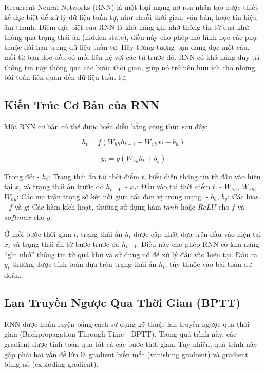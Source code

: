 Recurrent Neural Networks (RNN) là một loại mạng nơ-ron nhân tạo được thiết kế đặc biệt để xử lý dữ liệu tuần tự, như chuỗi thời gian, văn bản, hoặc tín hiệu âm thanh. Điểm đặc biệt của RNN là khả năng ghi nhớ thông tin từ quá khứ thông qua trạng thái ẩn (hidden state), điều này cho phép mô hình học các phụ thuộc dài hạn trong dữ liệu tuần tự. Hãy tưởng tượng bạn đang đọc một câu, mỗi từ bạn đọc đều có mối liên hệ với các từ trước đó. RNN có khả năng duy trì thông tin này thông qua các bước thời gian, giúp nó trở nên hữu ích cho những bài toán liên quan đến dữ liệu tuần tự.

\subsection{Kiến Trúc Cơ Bản của RNN}

Một RNN cơ bản có thể được biểu diễn bằng công thức sau đây:

\begin{equation}
    h_t = f(W_{hh} h_{t-1} + W_{xh} x_t + b_h)
\end{equation}

\begin{equation}
    y_t = g(W_{hy} h_t + b_y)
\end{equation}

Trong đó:
- $h_t$: Trạng thái ẩn tại thời điểm $t$, biểu diễn thông tin từ đầu vào hiện tại $x_t$ và trạng thái ẩn trước đó $h_{t-1}$.
- $x_t$: Đầu vào tại thời điểm $t$.
- $W_{hh}$, $W_{xh}$, $W_{hy}$: Các ma trận trọng số kết nối giữa các đơn vị trong mạng.
- $b_h$, $b_y$: Các bias.
- $f$ và $g$: Các hàm kích hoạt, thường sử dụng hàm $tanh$ hoặc $ReLU$ cho $f$ và $softmax$ cho $g$.

Ở mỗi bước thời gian $t$, trạng thái ẩn $h_t$ được cập nhật dựa trên đầu vào hiện tại $x_t$ và trạng thái ẩn từ bước trước đó $h_{t-1}$. Điều này cho phép RNN có khả năng “ghi nhớ” thông tin từ quá khứ và sử dụng nó để xử lý đầu vào hiện tại. Đầu ra $y_t$ thường được tính toán dựa trên trạng thái ẩn $h_t$, tùy thuộc vào bài toán dự đoán.

\subsection{Lan Truyền Ngược Qua Thời Gian (BPTT)}

RNN được huấn luyện bằng cách sử dụng kỹ thuật lan truyền ngược qua thời gian (Backpropagation Through Time - BPTT). Trong quá trình này, các gradient được tính toán qua tất cả các bước thời gian. Tuy nhiên, quá trình này gặp phải hai vấn đề lớn là gradient biến mất (vanishing gradient) và gradient bùng nổ (exploding gradient).

